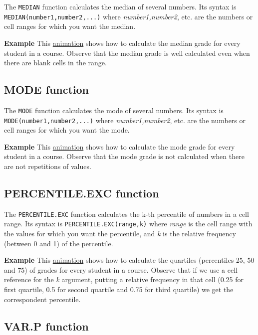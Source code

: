 The \texttt{MEDIAN} function calculates the median of several numbers. Its syntax is \texttt{MEDIAN(number1,number2,...)} where \emph{number1,number2}, etc. are the numbers or cell ranges for which you want the median.

\textbf{Example} This \href{http://aprendeconalf.es/office/excel/manual/img/example_function_median.gif}{animation} shows how to calculate the median grade for every student in a course. Observe that the median grade is well calculated even when there are blank cells in the range.

\subsection{MODE function}\hypertarget{mode-function}{}\label{mode-function}

The \texttt{MODE} function calculates the mode of several numbers. Its syntax is \texttt{MODE(number1,number2,...)} where \emph{number1,number2}, etc. are the numbers or cell ranges for which you want the mode.

\textbf{Example} This \href{http://aprendeconalf.es/office/excel/manual/img/example_function_mode.gif}{animation} shows how to calculate the mode grade for every student in a course. Observe that the mode grade is not calculated when there are not repetitions of values.

\subsection{PERCENTILE.EXC function}\hypertarget{percentileexc-function}{}\label{percentileexc-function}

The \texttt{PERCENTILE.EXC} function calculates the k-th percentile of numbers in a cell range. Its syntax is \texttt{PERCENTILE.EXC(range,k)} where \emph{range} is the cell range with the values for which you want the percentile, and \emph{k} is the relative frequency (between 0 and 1) of the percentile.

\textbf{Example} This \href{http://aprendeconalf.es/office/excel/manual/img/example_function_percentile.gif}{animation} shows how to calculate the quartiles (percentiles 25, 50 and 75) of grades for every student in a course. Observe that if we use a cell reference for the \emph{k} argument, putting a relative frequency in that cell (0.25 for first quartile, 0.5 for second quartile and 0.75 for third quartile) we get the correspondent percentile.

\subsection{VAR.P function}\hypertarget{varp-function}{}\label{varp-function}

